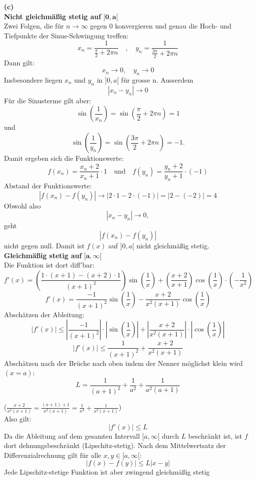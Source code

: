 \documentclass[a4paper,12pt]{article}
\begin{document}
\noindent\textbf{(c)} \\
\textbf{Nicht gleichmäßig stetig auf }$\mathbf{]0,a[}$\\

Zwei Folgen, die für $n \to \infty$ gegen $0$ konvergieren und genau die Hoch- und Tiefpunkte der Sinus-Schwingung treffen:
$$x_n = \frac{1}{\frac{\pi}{2} + 2\pi n} \quad , \quad y_n = \frac{1}{\frac{3\pi}{2} + 2\pi n}$$
Dann gilt:
$$x_n \rightarrow 0, \quad y_n \rightarrow 0$$
Insbesondere liegen $x_n$ und $y_n$ in $]0,a[$ für grosse n. Ausserdem 
$$|x_n - y_n| \rightarrow 0$$
Für die Sinusterme gilt aber: $$\sin\left(\frac{1}{x_n}\right) = \sin\left(\frac{\pi}{2} + 2\pi n\right) = 1$$ und $$\sin\left(\frac{1}{y_n}\right) = \sin\left(\frac{3\pi}{2} + 2\pi n\right) = -1.$$
Damit ergeben sich die Funktionswerte:$$f(x_n) = \frac{x_n+2}{x_n+1} \cdot 1 \quad \text{und} \quad f(y_n) = \frac{y_n+2}{y_n+1} \cdot (-1)$$
Abstand der Funktionswerte:
$$ |f(x_n) - f(y_n)| \rightarrow |2 \cdot 1 - 2 \cdot (-1)| = |2 - (-2)| = 4$$
Obwohl also
$$|x_n - y_n| \rightarrow 0,$$
geht 
$$|f(x_n) - f(y_n)|$$ nicht gegen null. Damit ist $f(x)$ auf $]0,a[$  nicht gleichmäßig stetig. \\
\bigskip
\textbf{Gleichmäßig stetig auf }$\mathbf{[a,\infty[}$\\
Die Funktion ist dort diff'bar:
$$f'(x) = \left( \frac{1\cdot(x+1) - (x+2)\cdot1}{(x+1)^2} \right) \sin\left(\frac{1}{x}\right) + \left( \frac{x+2}{x+1} \right) \cos\left(\frac{1}{x}\right) \cdot \left(-\frac{1}{x^2}\right)$$
$$f'(x) = \frac{-1}{(x+1)^2} \sin\left(\frac{1}{x}\right) - \frac{x+2}{x^2(x+1)} \cos\left(\frac{1}{x}\right)$$
Abschätzen der Ableitung: 
$$|f'(x)| \le \left| \frac{-1}{(x+1)^2} \right| \cdot \left|\sin\left(\frac{1}{x}\right)\right| + \left| \frac{x+2}{x^2(x+1)} \right| \cdot \left|\cos\left(\frac{1}{x}\right)\right|$$$$|f'(x)| \le \frac{1}{(x+1)^2} + \frac{x+2}{x^2(x+1)}$$
Abschätzen nach der Brüche nach oben indem der Nenner möglichst klein wird $(x=a)$:
$$L = \frac{1}{(a+1)^2} + \frac{1}{a^2} + \frac{1}{a^2(a+1)}$$

($\frac{x+2}{x^2(x+1)} = \frac{(x+1) + 1}{x^2(x+1)} = \frac{1}{x^2} + \frac{1}{x^2(x+1)}$)\\
Also gilt:
$$|f'(x)| \le L$$
Da die Ableitung auf dem gesamten Intervall $[a, \infty[$ durch $L$ beschränkt ist, ist $f$ dort dehnungsbeschränkt (Lipschitz-stetig). Nach dem Mittelwertsatz der Differenzialrechnung gilt für alle $x, y \in [a, \infty[$:$$|f(x) - f(y)| \le L |x - y|$$
Jede Lipschitz-stetige Funktion ist aber zwingend gleichmäßig stetig
\end{document}
